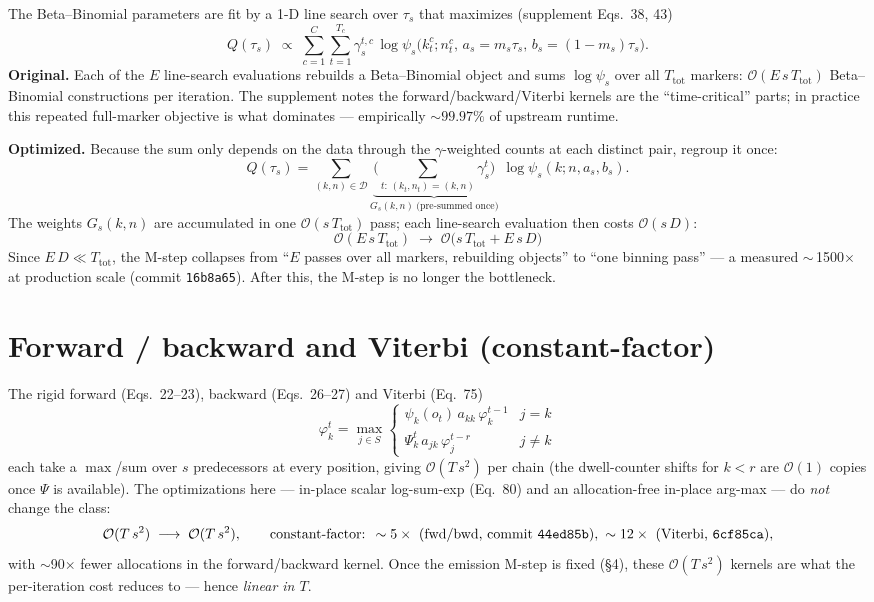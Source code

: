 \documentclass[11pt]{article}
\newcommand{\bigO}{\mathcal{O}}
\newcommand{\code}[1]{\texttt{#1}}
\begin{document}
The Beta--Binomial parameters are fit by a 1-D line search over $\tau_s$ that
maximizes (supplement Eqs.~38, 43)
\begin{equation}
Q(\tau_s)\;\propto\;\sum_{c=1}^{C}\sum_{t=1}^{T_c}\gamma^{t,c}_s\,
\log\psi_s\!\big(k^{c}_t;n^{c}_t,\,a_s=m_s\tau_s,\,b_s=(1-m_s)\tau_s\big).
\tag{43}
\end{equation}
\textbf{Original.} Each of the $E$ line-search evaluations rebuilds a
Beta--Binomial object and sums $\log\psi_s$ over all $T_{\text{tot}}$ markers:
$\bigO(E\,s\,T_{\text{tot}})$ Beta--Binomial constructions per iteration. The
supplement notes the forward/backward/Viterbi kernels are the ``time-critical''
parts; in practice this repeated full-marker objective is what dominates ---
empirically $\sim 99.97\%$ of upstream runtime.

\textbf{Optimized.} Because the sum only depends on the data through the
$\gamma$-weighted counts at each distinct pair, regroup it once:
\begin{equation}
Q(\tau_s)=\sum_{(k,n)\in\mathcal D}\!\underbrace{\Big(\!\!\sum_{t:\,(k_t,n_t)=(k,n)}\!\!\gamma^{t}_s\Big)}_{G_s(k,n)\ \text{(pre-summed once)}}\;\log\psi_s(k;n,a_s,b_s).
\end{equation}
The weights $G_s(k,n)$ are accumulated in one $\bigO(s\,T_{\text{tot}})$ pass;
each line-search evaluation then costs $\bigO(s\,D)$:
\[
\boxed{\;\bigO(E\,s\,T_{\text{tot}})\;\longrightarrow\;\bigO\big(s\,T_{\text{tot}}+E\,s\,D\big)\;}
\]
Since $E\,D\ll T_{\text{tot}}$, the M-step collapses from ``$E$ passes over all
markers, rebuilding objects'' to ``one binning pass'' --- a measured
$\sim$\,1500$\times$ at production scale (commit \code{16b8a65}). After this, the
M-step is no longer the bottleneck.

\section{Forward / backward and Viterbi (constant-factor)}

The rigid forward (Eqs.~22--23), backward (Eqs.~26--27) and Viterbi (Eq.~75)
\[
\varphi^{t}_k=\max_{j\in S}
\begin{cases}\psi_k(o_t)\,a_{kk}\,\varphi^{t-1}_k & j=k\\[2pt]
\Psi^{t}_k\,a_{jk}\,\varphi^{t-r}_j & j\ne k\end{cases}
\tag{75}
\]
each take a $\max$/sum over $s$ predecessors at every position, giving
$\bigO(T\,s^2)$ per chain (the dwell-counter shifts for $k<r$ are $\bigO(1)$
copies once $\Psi$ is available). The optimizations here --- in-place scalar
log-sum-exp (Eq.~80) and an allocation-free in-place arg-max --- do \emph{not}
change the class:
\[
\bigO(T\,s^2)\;\longrightarrow\;\bigO(T\,s^2),
\qquad\text{constant-factor: }\sim 5\times\ (\text{fwd/bwd, commit \code{44ed85b}}),\ \sim 12\times\ (\text{Viterbi, \code{6cf85ca}}),
\]
with $\sim$90$\times$ fewer allocations in the forward/backward kernel. Once the
emission M-step is fixed (\S4), these $\bigO(T\,s^2)$ kernels are what the
per-iteration cost reduces to --- hence \emph{linear in $T$}.
\end{document}
